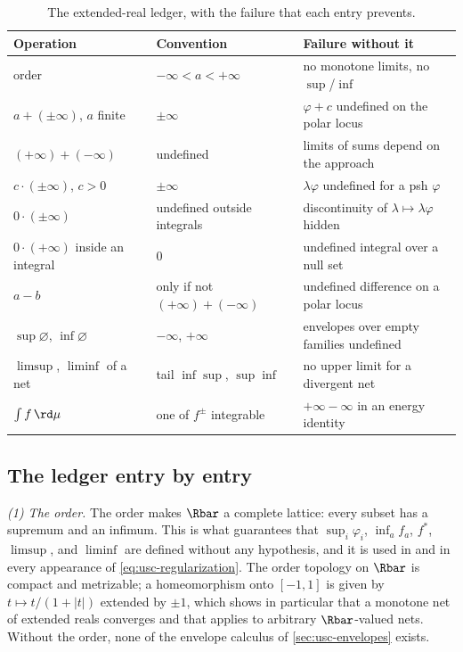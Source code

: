 \begin{table}
\caption{The extended-real ledger, with the failure that each entry prevents.}
\label{tab:extended-real-ledger}
\begin{tabular}{@{}lll@{}}
\toprule
Operation & Convention & Failure without it\\
\midrule
order & $-\infty<a<+\infty$ &
  no monotone limits, no $\sup$/$\inf$\\
$a+(\pm\infty)$, $a$ finite & $\pm\infty$ &
  $\varphi+c$ undefined on the polar locus\\
$(+\infty)+(-\infty)$ & undefined &
  limits of sums depend on the approach\\
$c\cdot(\pm\infty)$, $c>0$ & $\pm\infty$ &
  $\lambda\varphi$ undefined for a psh $\varphi$\\
$0\cdot(\pm\infty)$ & undefined outside integrals &
  discontinuity of $\lambda\mapsto\lambda\varphi$ hidden\\
$0\cdot(+\infty)$ inside an integral & $0$ &
  undefined integral over a null set\\
$a-b$ & only if not $(+\infty)+(-\infty)$ &
  undefined difference on a polar locus\\
$\sup\varnothing$, $\inf\varnothing$ & $-\infty$, $+\infty$ &
  envelopes over empty families undefined\\
$\limsup$, $\liminf$ of a net & tail $\inf\sup$, $\sup\inf$ &
  no upper limit for a divergent net\\
$\int f\,\rd\mu$ & one of $f^\pm$ integrable &
  $+\infty-\infty$ in an energy identity\\
\bottomrule
\end{tabular}
\end{table}

\subsection{The ledger entry by entry}
\label{subsec:ledger-commentary}

\emph{(1) The order.}  The order makes $\Rbar$ a complete lattice: every
subset has a supremum and an infimum.  This is what guarantees that
$\sup_i\varphi_i$, $\inf_a f_a$, $f^*$, $\limsup$, and $\liminf$ are defined
without any hypothesis, and it is used in
 and in every appearance of
\eqref{eq:usc-regularization}.  The order topology on $\Rbar$ is compact and
metrizable; a homeomorphism onto $[-1,1]$ is given by
$t\mapsto t/(1+|t|)$ extended by $\pm1$, which shows in particular that a
monotone net of extended reals converges and that
 applies to arbitrary $\Rbar$-valued nets.
Without the order, none of the envelope calculus of
\cref{sec:usc-envelopes} exists.

